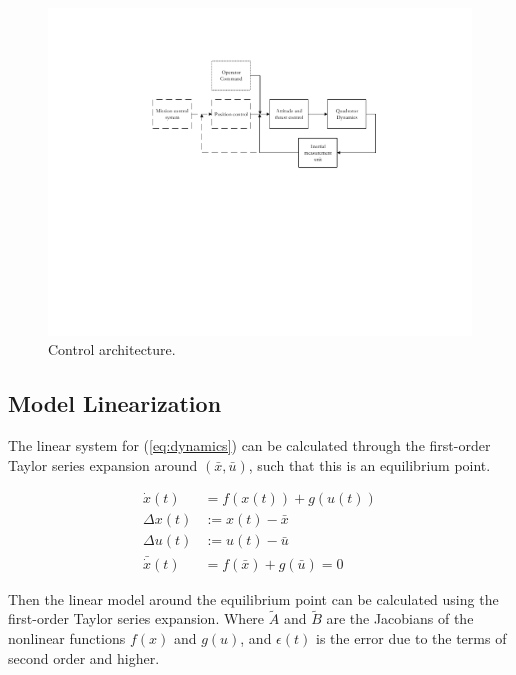 \documentclass[12pt]{article}
\begin{document}
\begin{figure}
  \centering
  \includegraphics{control.pdf}
  \caption{Control architecture.}
  \label{fig:control}
\end{figure}

\subsection{Model Linearization}
\label{sec:linearization}
The linear system for (\ref{eq:dynamics}) can be calculated through the first-order Taylor series expansion around $\left (\bar{x},\bar{u} \right )$, such that this is an equilibrium point.

\begin{equation}
  \begin{split}
    \dot{x}(t) &= f(x(t)) + g(u(t)) \\
    \Delta x(t) &:= x(t) - \bar{x} \\
    \Delta u(t) &:= u(t) - \bar{u} \\
    \bar{\dot{x}}(t) &= f(\bar{x}) + g(\bar{u}) = 0
  \end{split}
\end{equation}

Then the linear model around the equilibrium point can be calculated using the first-order Taylor series expansion. Where $\tilde{A}$ and $\tilde{B}$ are the Jacobians of the nonlinear functions $f(x)$ and $g(u)$, and $\epsilon (t)$ is the error due to the terms of second order and higher.
\end{document}
